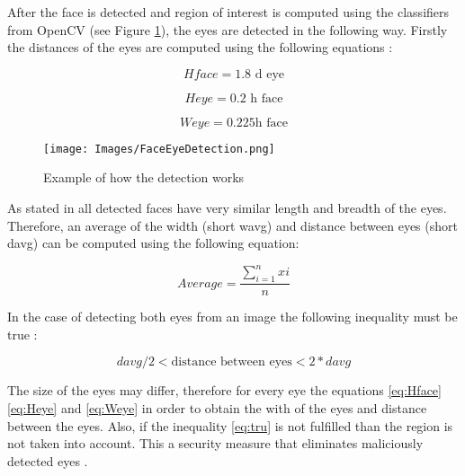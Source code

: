 After the face is detected and region of interest is computed using the classifiers from OpenCV (see Figure \ref{fig:FaceEyeDetection}), the eyes are detected in the following way. Firstly the distances of the eyes are computed using the following equations \cite{OpenViola}:

\begin{equation} \label{eq:Hface}
    Hface =\text{1.8 d eye}
\end{equation}

\begin{equation} \label{eq:Heye}
    Heye =\text{0.2 h face}
\end{equation}

\begin{equation} \label{eq:Weye}
    Weye =\text{0.225h face}
\end{equation}

\begin{figure}[h!]
    \centering
    \texttt{[image: Images/FaceEyeDetection.png]}
    \caption{Example of how the detection works \cite{OpenViola}}
    \label{fig:FaceEyeDetection}
\end{figure}

As stated in \cite{OpenViola} all detected faces have very similar length and breadth of the eyes. Therefore, an average of the width (short wavg) and distance between eyes (short davg) can be computed using the following equation:

\begin{center}
    \begin{equation} \label{eq:Average}
        \textit{Average} = \frac{\sum_{i=1}^n xi}{n} 
    \end{equation}
\end{center}

In the case of detecting both eyes from an image the following inequality must be true \cite{OpenViola}: 
\begin{center}
    \begin{equation} \label{eq:tru}
        davg/2 < \text{distance between eyes} < 2*davg 
    \end{equation}
\end{center}

The size of the eyes may differ, therefore for every eye the equations \ref{eq:Hface} \ref{eq:Heye} and \ref{eq:Weye} in order to obtain the with of the eyes and distance between the eyes. Also, if the inequality \ref{eq:tru} is not fulfilled than the region is not taken into account. This a security measure that eliminates maliciously detected eyes \cite{OpenViola}. \par

